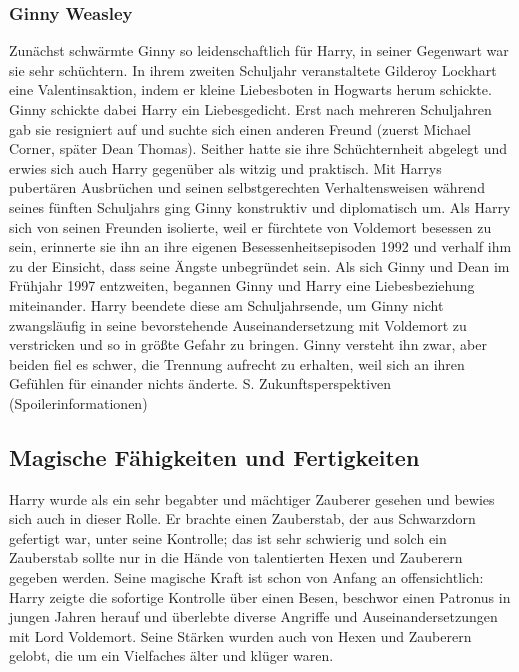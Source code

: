 \documentclass[a4paper, 10pt]{article}
\begin{document}
\subsubsection*{\large Ginny Weasley}
Zunächst schwärmte Ginny so leidenschaftlich für Harry, in seiner Gegenwart war sie sehr schüchtern. In ihrem zweiten Schuljahr veranstaltete Gilderoy Lockhart eine Valentinsaktion, indem er kleine Liebesboten in Hogwarts herum schickte. Ginny schickte dabei Harry ein Liebesgedicht. Erst nach mehreren Schuljahren gab sie resigniert auf und suchte sich einen anderen Freund (zuerst Michael Corner, später Dean Thomas). Seither hatte sie ihre Schüchternheit abgelegt und erwies sich auch Harry gegenüber als witzig und praktisch.
\vspace{10pt}
\newline
Mit Harrys pubertären Ausbrüchen und seinen selbstgerechten Verhaltensweisen während seines fünften Schuljahrs ging Ginny konstruktiv und diplomatisch um. Als Harry sich von seinen Freunden isolierte, weil er fürchtete von Voldemort besessen zu sein, erinnerte sie ihn an ihre eigenen Besessenheitsepisoden 1992 und verhalf ihm zu der Einsicht, dass seine Ängste unbegründet sein.
\vspace{10pt}
\newline
Als sich Ginny und Dean im Frühjahr 1997 entzweiten, begannen Ginny und Harry eine Liebesbeziehung miteinander. Harry beendete diese am Schuljahrsende, um Ginny nicht zwangsläufig in seine bevorstehende Auseinandersetzung mit Voldemort zu verstricken und so in größte Gefahr zu bringen. Ginny versteht ihn zwar, aber beiden fiel es schwer, die Trennung aufrecht zu erhalten, weil sich an ihren Gefühlen für einander nichts änderte. S. Zukunftsperspektiven (Spoilerinformationen)
\subsection*{\Large Magische Fähigkeiten und Fertigkeiten}
Harry wurde als ein sehr begabter und mächtiger Zauberer gesehen und bewies sich auch in dieser Rolle. Er brachte einen Zauberstab, der aus Schwarzdorn gefertigt war, unter seine Kontrolle; das ist sehr schwierig und solch ein Zauberstab sollte nur in die Hände von talentierten Hexen und Zauberern gegeben werden. Seine magische Kraft ist schon von Anfang an offensichtlich: Harry zeigte die sofortige Kontrolle über einen Besen, beschwor einen Patronus in jungen Jahren herauf und überlebte diverse Angriffe und Auseinandersetzungen mit Lord Voldemort. Seine Stärken wurden auch von Hexen und Zauberern gelobt, die um ein Vielfaches älter und klüger waren.
\end{document}
